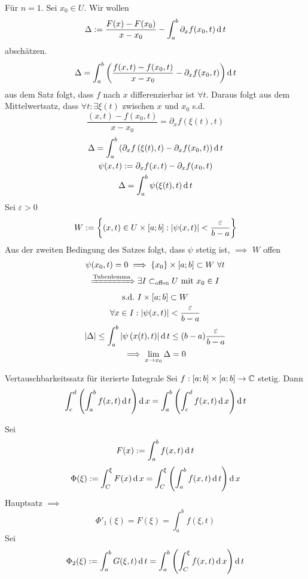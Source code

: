 \begin{Bew}
  Für $n=1$. Sei $x_0\in U$. Wir wollen
  \begin{gather*}
    \Delta := \frac{F(x)-F(x_0)}{x-x_0}-\int^b_a\partial_xf(x_0,t)\operatorname{d} t
  \end{gather*}
  abschätzen.
  \begin{gather*}
    \Delta = \int^b_a\left(  \frac{f(x,t)-f(x_0,t)}{x-x_0}-\partial_xf(x_0,t) \right)\operatorname{d} t
  \end{gather*}
  aus dem Satz folgt, dass $f$ nach $x$ differenzierbar ist $\forall t$. Daraus folgt aus dem Mittelwertsatz, dass $\forall t:\exists \xi(t)$ zwischen $x$ und $x_0$ s.d.
  \[\frac{(x,t)-f(x_0,t)}{x-x_0}=\partial_xf\left( \xi(t),t \right)\]
  \begin{gather*}
    \Delta = \int^b_a\left( \partial_xf\left( \xi(t),t \right)-\partial_xf(x_0,t) \right)\operatorname{d} t\\
    \psi(x,t):=\partial_xf(x,t)-\partial_xf(x_0,t)\\
    \Delta = \int_a^b\psi(\xi(t),t)\operatorname{d} t
  \end{gather*}
  Sei $\varepsilon>0$
  \begin{gather*}
    W:=\left\{ (x,t)\in U\times \left[ a;b \right]:\left| \psi(x,t) \right|<\frac{\varepsilon}{b-a} \right\}
  \end{gather*}
  Aus der zweiten Bedingung des Satzes folgt, dass $\psi$ stetig ist, $\implies$ $W$ offen
  \begin{gather*}
    \psi(x_0,t)=0\implies \left\{ x_0 \right\}\times \left[ a;b \right]\subset W\  \forall t\\
    \xRightarrow{\text{Tubenlemma}} \exists I\subset_{\text{offen}} U\ \text{mit}\  x_0\in I\\
    \text{s.d.}\ I\times \left[ a;b \right]\subset W\\
    \forall x\in I:\Abs{\psi(x,t)}<\frac{\varepsilon}{b-a}\\
    \Abs{\Delta}\leq\int^b_a\Abs{\psi\left( x(t),t \right)}\md t\leq (b-a)\frac{\varepsilon}{b-a}\\
    \implies\lim_{x\to x_0}\Delta =0
  \end{gather*}
\end{Bew}
\begin{Kor}{Vertauschbarkeitssatz für iterierte Integrale}
  Sei $f:\left[ a;b \right]\times \left[ a;b \right]\to\mathbb{C}$ stetig. Dann
  \[\int_c^d\left( \int_a^bf(x,t)\operatorname{d} t \right)\operatorname{d} x = \int_a^b\left( \int_c^df(x,t)\operatorname{d} x \right)\operatorname{d} t\]
\end{Kor}
\begin{Bew}
  Sei
  \[F(x):=\int^b_af(x,t)\operatorname{d} t\]
  \[\Phi(\xi):=\int_C^\xi F(x)\operatorname{d} x=\int_C^\xi \left( \int_a^bf(x,t)\operatorname{d} t \right)\operatorname{d} x\]
  Hauptsatz $\implies$
  \[\Phi'_1(\xi)=F(\xi)=\int_a^bf(\xi,t)\]
  Sei
  \[\Phi_2(\xi):=\int_a^bG(\xi,t)\operatorname{d} t=\int^b_a\left( \int_C^\xi f(x,t)\operatorname{d} x \right)\operatorname{d} t\]
\end{Bew}
